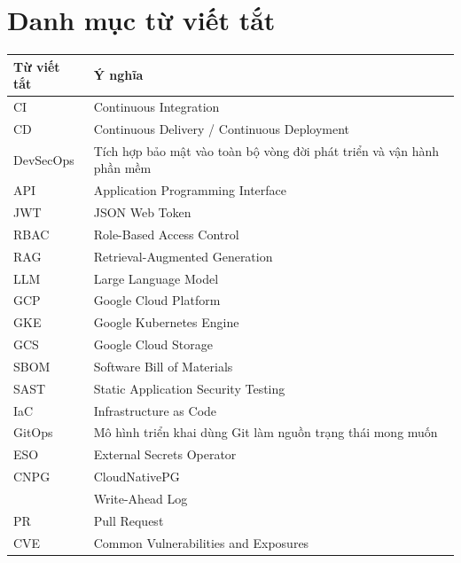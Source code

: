 \chapter*{Danh mục từ viết tắt}

\begingroup
\small
{}
\renewcommand{\arraystretch}{1.05}
\begin{center}
\begin{tabularx}{\textwidth}{|L{3cm}|Y|}
\hline
\textbf{Từ viết tắt} & \textbf{Ý nghĩa} \\
\hline
CI & Continuous Integration \\
CD & Continuous Delivery / Continuous Deployment \\
DevSecOps & Tích hợp bảo mật vào toàn bộ vòng đời phát triển và vận hành phần mềm \\
API & Application Programming Interface \\
JWT & JSON Web Token \\
RBAC & Role-Based Access Control \\
RAG & Retrieval-Augmented Generation \\
LLM & Large Language Model \\
GCP & Google Cloud Platform \\
GKE & Google Kubernetes Engine \\
GCS & Google Cloud Storage \\
SBOM & Software Bill of Materials \\
SAST & Static Application Security Testing \\
IaC & Infrastructure as Code \\
GitOps & Mô hình triển khai dùng Git làm nguồn trạng thái mong muốn \\
ESO & External Secrets Operator \\
CNPG & CloudNativePG \\
\WAL{} & Write-Ahead Log \\
PR & Pull Request \\
CVE & Common Vulnerabilities and Exposures \\
\hline
\end{tabularx}
\end{center}
\endgroup
